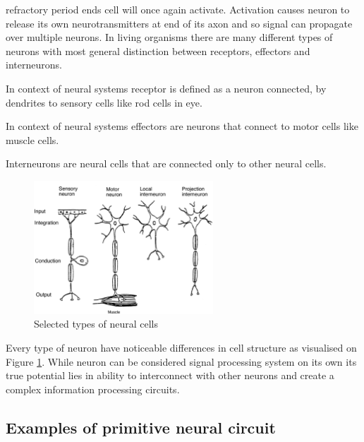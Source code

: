 refractory period ends cell will once again activate.
Activation causes neuron to release its own neurotransmitters at end of its axon and so signal
can propagate over multiple neurons. 
In living organisms there are many different types of neurons with most general distinction
between receptors, effectors and interneurons.
\begin{definition}[Receptor]
	In context of neural systems receptor is defined as a neuron connected, by dendrites to sensory 
	cells like rod cells in eye.
\end{definition}
\begin{definition}[Effector]
	In context of neural systems effectors are neurons that connect to motor cells like muscle 
	cells.
\end{definition}
\begin{definition}[Interneuron]
	Interneurons are neural cells that are connected only to other neural cells.
\end{definition}

\begin{figure}[htb] 
	\centering
	\includegraphics[width=0.6\textwidth]{figures/bio_neurons}
	\caption{Selected types of neural cells}
	\label{fig:bio_neurons}
\end{figure}
Every type of neuron have noticeable differences in cell structure as visualised on 
Figure \ref{fig:bio_neurons}. 
While neuron can be considered signal processing system on its own its true potential lies in 
ability to interconnect with other neurons and create a complex information processing circuits.

\FloatBarrier
\subsection{Examples of primitive neural circuit}

